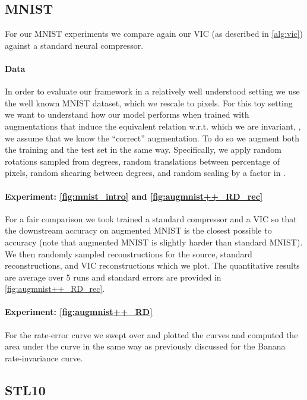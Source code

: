 \documentclass[final]{article}
\begin{document}
\subsection{MNIST}
\label{appx:reproducability_mnist}

For our MNIST \cite{lecun_gradient-based_1998} experiments we compare again our VIC (as described in \cref{alg:vic}) against a standard neural compressor.

\paragraph{Data}
In order to evaluate our framework in a relatively well understood setting we use the well known  MNIST \cite{lecun_gradient-based_1998} dataset, which we rescale to  pixels.
For this toy setting we want to understand how our model performs when trained with augmentations that induce the equivalent relation w.r.t. which we are invariant, \ie, we assume that we know the ``correct'' augmentation.
To do so we augment both the training and the test set in the same way.
Specifically, we apply random rotations sampled from  degrees, random translations between  percentage of pixels, random shearing between  degrees, and random scaling by a factor in . 

\paragraph{Experiment: \cref{fig:mnist_intro} and \cref{fig:augmnist++_RD_rec}}
For a fair comparison we took trained a standard compressor and a VIC so that the downstream accuracy on augmented MNIST is the closest possible to  accuracy (note that augmented MNIST is slightly harder than standard MNIST).
We then randomly sampled reconstructions for the source, standard reconstructions, and VIC reconstructions which we plot.
The quantitative results are average over 5 runs and standard errors are provided in \cref{fig:augmnist++_RD_rec}.

\paragraph{Experiment: \cref{fig:augmnist++_RD}}
For the rate-error curve we swept over  and plotted the curves and computed the area under the curve in the same way as previously discussed for the Banana rate-invariance curve.




\subsection{STL10}
\label{appx:reproducability_stl10}
\end{document}
